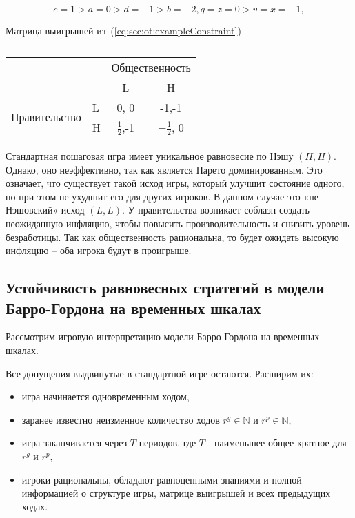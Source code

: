 \begin{equation}
\label{eq:sec:ot:exampleConstraint}
c=1 > a=0 > d=-1 > b=-2, q=z=0 > v=x=-1,
\end{equation}

\begin{table}[h]
	\centering
	
	\caption{}	
 Матрица выигрышей из~(\ref{eq:sec:ot:exampleConstraint})\\
	\normalsize
\begin{tabular}{|l|l|c|c|}
	\hline
	\multicolumn{2}{|l|}{\multirow{2}{*}{}} & \multicolumn{2}{l|}{Общественность} \\ \cline{3-4} 
	\multicolumn{2}{|l|}{}                  & L                & H                \\ \hline
	\multirow{2}{*}{Правительство}    & L   & 0, 0             & -1,-1            \\ \cline{2-4} 
	& H   & $\frac{1}{2}$,-1             & $-\frac{1}{2}$, 0            \\ \hline
\end{tabular}
		
	\label{table:sec:ot:real}
\end{table}


Стандартная пошаговая игра имеет уникальное равновесие по Нэшу $(H,H)$. Однако, оно неэффективно, так как является Парето доминированным. Это означает, что существует такой исход игры, который улучшит состояние одного, но при этом не ухудшит его для других игроков. В данном случае это «не Нэшовский» исход $(L,L)$.  У правительства возникает соблазн создать неожиданную инфляцию, чтобы повысить производительность и снизить уровень безработицы. Так как общественность рациональна, то будет ожидать высокую инфляцию – оба игрока будут в проигрыше. 


\subsection{Устойчивость равновесных стратегий в модели Барро-Гордона на
	временных шкалах} 

Рассмотрим игровую интерпретацию модели Барро-Гордона на временных шкалах.

Все допущения выдвинутые в стандартной игре остаются. Расширим их:
\begin{itemize}
	\item игра начинается одновременным ходом, 
	\item заранее известно неизменное количество ходов $r^g \in \mathbb{N}$ и $r^p \in \mathbb{N}$,
	\item игра заканчивается через $T$ периодов, где $T$ - наименьшее общее кратное для $r^g$ и $r^p$,
	\item игроки рациональны, обладают равноценными знаниями и полной информацией о структуре игры, матрице выигрышей и всех предыдущих ходах.
\end{itemize}

